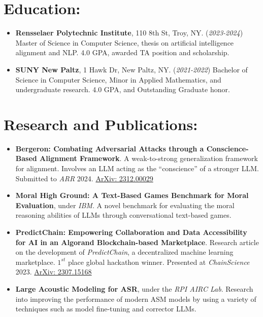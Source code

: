 \documentclass[12pt]{article}
\begin{document}
\section*{Education:}
\begin{itemize}
    \itemsep0em
    \item \textbf{Rensselaer Polytechnic Institute}, 110 8th St, Troy, NY. (\textit{2023-2024}) Master of Science in Computer Science, thesis on artificial intelligence alignment and NLP.  4.0 GPA, awarded TA position and scholarship.
    \item \textbf{SUNY New Paltz}, 1 Hawk Dr, New Paltz, NY. (\textit{2021-2022}) Bachelor of Science in Computer Science, Minor in Applied Mathematics, and undergraduate research. 4.0 GPA, and Outstanding Graduate honor.
\end{itemize}

\section*{Research and Publications:}
\begin{itemize}
    \itemsep0em
    
    \item \textbf{Bergeron: Combating Adversarial Attacks through a Conscience-Based Alignment Framework}.  A weak-to-strong generalization framework for alignment.  Involves an LLM acting as the ``conscience'' of a stronger LLM.  Submitted to \textit{ARR} 2024.  \href{https://arxiv.org/abs/2312.00029}{ArXiv: 2312.00029}
    
    \item \textbf{Moral High Ground: A Text-Based Games Benchmark for Moral Evaluation}, under \textit{IBM}.  A novel benchmark for evaluating the moral reasoning abilities of LLMs through conversational text-based games.
    
    \item \textbf{PredictChain: Empowering Collaboration and Data Accessibility for AI in an Algorand Blockchain-based Marketplace}.  Research article on the development of \textit{PredictChain}, a decentralized machine learning marketplace.  $1^{st}$ place global hackathon winner.  Presented at \textit{ChainScience} 2023. \href{https://arxiv.org/abs/2307.15168}{ArXiv: 2307.15168}
    
    \item \textbf{Large Acoustic Modeling for ASR}, under the \textit{RPI AIRC Lab}. Research into improving the performance of modern ASM models by using a variety of techniques such as model fine-tuning and corrector LLMs.
    
\end{itemize}
\end{document}
